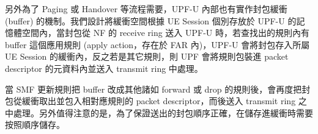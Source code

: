 另外為了 Paging 或 Handover 等流程需要，UPF-U 內部也有實作封包緩衝 (buffer) 的機制。我們設計將緩衝空間根據 UE Session 個別存放於 UPF-U 的記憶體空間內，當封包從 NF 的 receive ring 送入 UPF-U 時，若查找出的規則內有 buffer 這個應用規則 (apply action，存在於 FAR 內)，UPF-U 會將封包存入所屬 UE Session 的緩衝內，反之若是其它規則，則 UPF 會將規則包裝進 packet descriptor 的元資料內並送入 transmit ring 中處理。

當 SMF 更新規則把 buffer 改成其他諸如 forward 或 drop 的規則後，會再度把封包從緩衝取出並包入相對應規則的 packet descriptor，而後送入 transmit ring 之中處理。另外值得注意的是，為了保證送出的封包順序正確，在儲存進緩衝時需要按照順序儲存。
